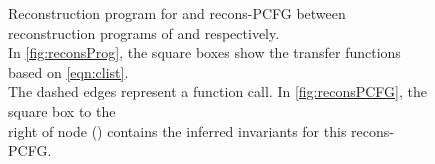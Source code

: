 \begin{figure}[t]
\begin{tabular}{cc}
\\
\end{tabular}
\caption{\label{fig:recons}Reconstruction program for  and recons-PCFG between reconstruction programs of  and  respectively. \\
In \cref{fig:reconsProg}, the square boxes show the transfer functions based on \cref{eqn:clist}.\\
The dashed edges represent a function call. In \cref{fig:reconsPCFG}, the square box to the \\ right of node () contains the inferred invariants for this recons-PCFG.}
\end{figure}
